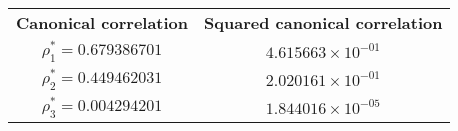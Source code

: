 \documentclass{article}
\begin{document}
	
	\begin{table}[h!]
		\centering
		\begin{tabular}{cc}
			\textbf{Canonical correlation} & \textbf{Squared canonical correlation} \\
			$\rho_1^* = 0.679386701$       & $4.615663 \times 10^{-01}$             \\
			$\rho_2^* = 0.449462031$       & $2.020161 \times 10^{-01}$             \\
			$\rho_3^* = 0.004294201$       & $1.844016 \times 10^{-05}$             \\
		\end{tabular}
		
	\end{table}
	
\end{document}
